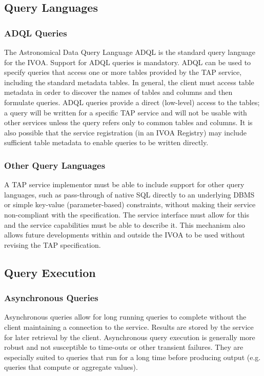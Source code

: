 \documentclass[11pt,letter]{ivoa}
\begin{document}
\subsection{Query Languages}

\subsubsection{ADQL Queries}
The Astronomical Data Query Language ADQL \citep{2008ivoa.spec.1030O} is the standard 
query language for the IVOA. Support for ADQL queries is mandatory. ADQL can be 
used to specify queries  that access one or more tables provided by the TAP 
service, including the standard metadata tables. In general, the client must 
access table metadata in order to discover the names of tables and columns and 
then formulate queries. ADQL queries provide a direct (low-level) access to the 
tables; a query will be written for a specific TAP service and will not be 
usable with other services unless the query refers only to common tables and 
columns. It is also possible that the service registration (in an IVOA Registry) 
may include sufficient table metadata to enable queries to be written directly.

\subsubsection{Other Query Languages}
A TAP service implementor must be able to include support for other query languages, such as
pass-through of native SQL directly to an underlying DBMS or simple key-value 
(parameter-based) constraints, without making their service non-compliant with the specification. The service interface must allow for 
this and the service capabilities must be able to describe it. This mechanism 
also allows future developments within and outside the IVOA to be used without 
revising the TAP specification.

\subsection{Query Execution}

\subsubsection{Asynchronous Queries}
Asynchronous queries allow for long running queries to complete without 
the client maintaining a connection to the service. Results are stored by 
the service for later retrieval by the client. Asynchronous query 
execution is generally more robust and not susceptible to time-outs or other 
transient failures. They are especially suited to queries that run for a long 
time before producing output (e.g. queries that compute or aggregate values).
\end{document}
